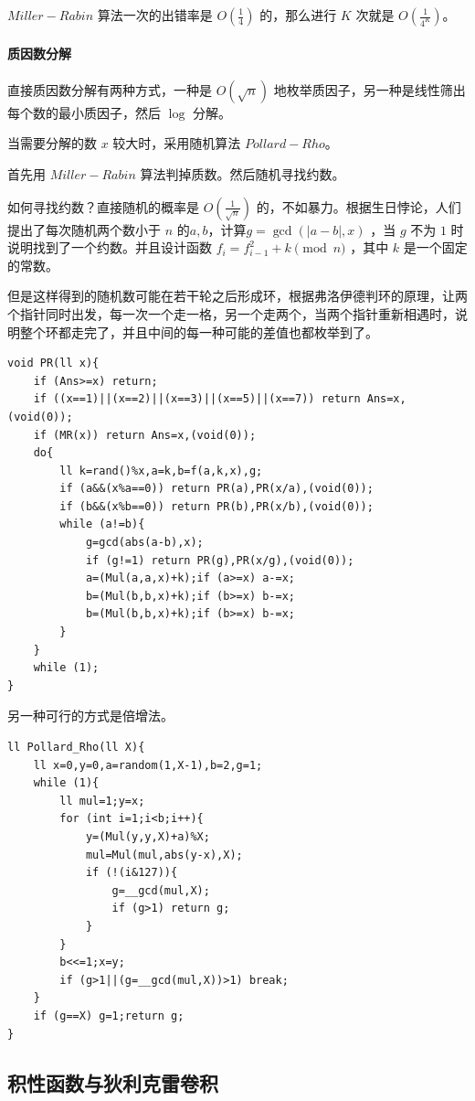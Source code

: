 \documentclass[UTF-8]{ctexart}
\begin{document}
$Miller-Rabin$ 算法一次的出错率是 $O(\frac{1}{4})$ 的，那么进行 $K$ 次就是 $O(\frac{1}{4^K})$。

\paragraph{质因数分解}
直接质因数分解有两种方式，一种是 $O(\sqrt{n})$ 地枚举质因子，另一种是线性筛出每个数的最小质因子，然后 $\log$ 分解。

当需要分解的数 $x$ 较大时，采用随机算法 $Pollard-Rho$。

首先用 $Miller-Rabin$ 算法判掉质数。然后随机寻找约数。

如何寻找约数？直接随机的概率是 $O(\frac{1}{\sqrt{n}})$ 的，不如暴力。根据生日悖论，人们提出了每次随机两个数小于 $n$ 的$a,b$，计算$g=\gcd(|a-b|,x)$ ，当 $g$ 不为 $1$ 时说明找到了一个约数。并且设计函数 $f_i=f_{i-1}^2+k \pmod{n}$ ，其中 $k$ 是一个固定的常数。

但是这样得到的随机数可能在若干轮之后形成环，根据弗洛伊德判环的原理，让两个指针同时出发，每一次一个走一格，另一个走两个，当两个指针重新相遇时，说明整个环都走完了，并且中间的每一种可能的差值也都枚举到了。
\begin{verbatim}
void PR(ll x){
    if (Ans>=x) return;
    if ((x==1)||(x==2)||(x==3)||(x==5)||(x==7)) return Ans=x,(void(0));
    if (MR(x)) return Ans=x,(void(0));
    do{
        ll k=rand()%x,a=k,b=f(a,k,x),g;
        if (a&&(x%a==0)) return PR(a),PR(x/a),(void(0));
        if (b&&(x%b==0)) return PR(b),PR(x/b),(void(0));
        while (a!=b){
            g=gcd(abs(a-b),x);
            if (g!=1) return PR(g),PR(x/g),(void(0));
            a=(Mul(a,a,x)+k);if (a>=x) a-=x;
            b=(Mul(b,b,x)+k);if (b>=x) b-=x;
            b=(Mul(b,b,x)+k);if (b>=x) b-=x;
        }
    }
    while (1);
}
\end{verbatim}
另一种可行的方式是倍增法。
\begin{verbatim}
ll Pollard_Rho(ll X){
    ll x=0,y=0,a=random(1,X-1),b=2,g=1;
    while (1){
        ll mul=1;y=x;
        for (int i=1;i<b;i++){
            y=(Mul(y,y,X)+a)%X;
            mul=Mul(mul,abs(y-x),X);
            if (!(i&127)){
                g=__gcd(mul,X);
                if (g>1) return g;
            }
        }
        b<<=1;x=y;
        if (g>1||(g=__gcd(mul,X))>1) break;
    }
    if (g==X) g=1;return g;
}
\end{verbatim}
	\subsection{积性函数与狄利克雷卷积}
\end{document}
